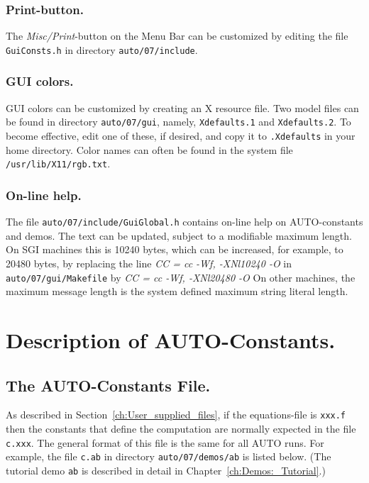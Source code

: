 \documentclass[12pt]{report}
\begin{document}
\subsection{ Print-button.}
The {\it Misc/Print}-button on the Menu Bar can be customized 
by editing the file {\tt GuiConsts.h} in directory {\tt auto/07/include}.

\subsection{ GUI colors.}
GUI colors can be customized by creating an X resource file.
Two model files can be found in directory {\tt auto/07/gui}, namely,
{\tt Xdefaults.1} and {\tt Xdefaults.2}.
To become effective, edit one of these, if desired,
and copy it to {\tt .Xdefaults} in your home directory.
Color names can often be found in the system file {\tt /usr/lib/X11/rgb.txt}.

\subsection{ On-line help.}
The file {\tt auto/07/include/GuiGlobal.h}
contains on-line help on {\cal AUTO}-constants and demos.
The text can be updated, subject to a modifiable maximum length.
On SGI machines this is 10240 bytes,
which can be increased, for example, to 20480 bytes, 
by replacing the line
{\it CC = cc -Wf, -XNl10240 -O}
in {\tt auto/07/gui/Makefile} by
{\it CC = cc -Wf, -XNl20480 -O}
On other machines, the maximum message length is the system defined maximum
string literal length.


\chapter{ Description of {\cal AUTO}-Constants.} \label{ch:AUTO_constants}
\section{ The {\cal AUTO}-Constants File.} \label{sec:The_AUTO_constants_file}
As described in Section~\ref{ch:User_supplied_files}, 
if the equations-file is {\tt xxx.f} 
then the constants that define the computation 
are normally expected in the file  {\tt c.xxx}.
The general format of this file is the same for all {\cal AUTO} runs.
For example, the file {\tt c.ab} 
in directory {\tt auto/07/demos/ab} is listed below.
(The tutorial demo {\tt ab} is described in detail in 
Chapter~\ref{ch:Demos:_Tutorial}.)  
\end{document}
